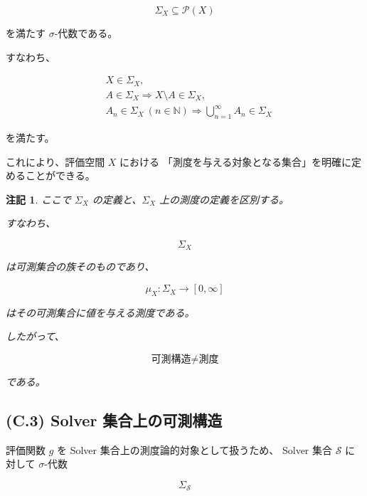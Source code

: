 \documentclass[a4paper,11pt]{article}
\newtheorem{remark}[definition]{注記}
\newcommand{\Solver}{\mathcal{S}}
\newcommand{\N}{\mathbb{N}}
\begin{document}
\begin{equation}
    \Sigma_X\subseteq\mathcal{P}(X)
\end{equation}

を満たす $\sigma$-代数である。

すなわち、

\begin{align}
    &X\in\Sigma_X,\\
    &A\in\Sigma_X
        \Longrightarrow
        X\setminus A\in\Sigma_X,\\
    &A_n\in\Sigma_X\ (n\in\N)
        \Longrightarrow
        \bigcup_{n=1}^{\infty}A_n\in\Sigma_X
\end{align}

を満たす。

これにより、評価空間 $X$ における
「測度を与える対象となる集合」を明確に定めることができる。

\begin{remark}
ここで $\Sigma_X$ の定義と、$\Sigma_X$ 上の測度の定義を区別する。

すなわち、

\begin{equation}
    \Sigma_X
\end{equation}

は可測集合の族そのものであり、

\begin{equation}
    \mu_X:\Sigma_X\to[0,\infty]
\end{equation}

はその可測集合に値を与える測度である。

したがって、

\begin{equation}
    \text{可測構造}
    \neq
    \text{測度}
\end{equation}

である。
\end{remark}


\subsection{(C.3) Solver 集合上の可測構造}
\label{subsec:C3}

評価関数 $g$ を Solver 集合上の測度論的対象として扱うため、
Solver 集合 $\Solver$ に対して $\sigma$-代数

\begin{equation}
    \Sigma_{\Solver}
\end{equation}
\end{document}
